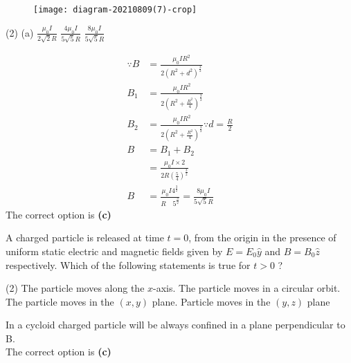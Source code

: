 \begin{enumerate}
\begin{minipage}{\textwidth}
		\begin{figure}[H]
			\centering
			\texttt{[image: diagram-20210809(7)-crop]}
			\caption{}
			\label{}
		\end{figure}
	\end{minipage}
	\begin{tasks}(2)
		\task[\textbf{A.}](a) $\frac{\mu_{0} I}{2 \sqrt{2} R}$
		\task[\textbf{B.}]$\frac{4 \mu_{0} I}{5 \sqrt{5} R}$
		\task[\textbf{C.}]$\frac{8 \mu_{0} I}{5 \sqrt{5} R}$
	\end{tasks}
	\begin{answer}
		\begin{align*}
		\because B&=\frac{\mu_{0} I R^{2}}{2\left(R^{2}+d^{2}\right)^{\frac{3}{2}}}\\ B_{1}&=\frac{\mu_{0} I R^{2}}{2\left(R^{2}+\frac{R^{2}}{4}\right)^{\frac{3}{2}}}\\
		B_{2}&=\frac{\mu_{0} I R^{2}}{2\left(R^{2}+\frac{R^{2}}{4}\right)^{\frac{3}{2}}} \because d=\frac{R}{2} \\
		B&=B_{1}+B_{2}\\
		&=\frac{\mu_{0} I \times 2}{2 R\left(\frac{5}{4}\right)^{\frac{3}{2}}}\\
		B&=\frac{\mu_{0} I 4^{\frac{3}{2}}}{R \quad 5^{\frac{3}{2}}}=\frac{8 \mu_{0} I}{5 \sqrt{5} R}
		\end{align*}
		The correct option is \textbf{(c)}	
	\end{answer}
	\begin{minipage}{\textwidth}
		\item A charged particle is released at time $t=0$, from the origin in the presence of uniform static electric and magnetic fields given by $E=E_{0} \hat{y}$ and $B=B_{0} \hat{z}$ respectively. Which of the following statements is true for $t>0$ ?
	\end{minipage}
	\begin{tasks}(2)
		\task[\textbf{A.}] The particle moves along the $x$-axis.
		\task[\textbf{B.}]The particle moves in a circular orbit.
		\task[\textbf{C.}]The particle moves in the $(x, y)$ plane.
		\task[\textbf{D.}] Particle moves in the $(y, z)$ plane
	\end{tasks}
	\begin{answer}
		In a cycloid charged particle will be always confined in a plane perpendicular to B.\\
		The correct option is \textbf{(c)}
	\end{answer}
	\begin{minipage}{\textwidth}

\end{minipage}
\end{enumerate}
